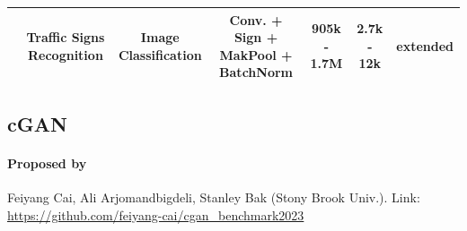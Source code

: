 \documentclass[oneside,11pt,dvipsnames]{book}
\begin{document}
\begin{table}[h]
{\begin{tabular}{ccccccc}
    & Traffic Signs Recognition & Image Classification & Conv. + Sign + MakPool + BatchNorm & 905k - 1.7M & 2.7k - 12k & extended \\
    \bottomrule
    \end{tabular}
    }
\end{table}


\subsection{cGAN}
\paragraph*{Proposed by} Feiyang Cai, Ali Arjomandbigdeli, Stanley Bak (Stony Brook Univ.). Link: \url{https://github.com/feiyang-cai/cgan_benchmark2023}
\end{document}
